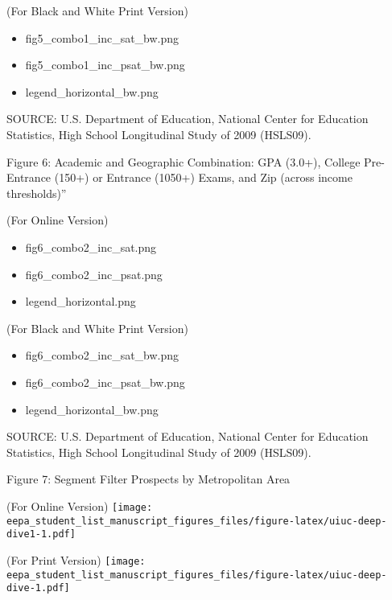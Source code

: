 \documentclass[
  12pt,
]{article}
\providecommand{\tightlist}{%
  \setlength{\itemsep}{0pt}\setlength{\parskip}{0pt}}
\begin{document}
(For Black and White Print Version)

\begin{itemize}
\tightlist
\item
  fig5\_combo1\_inc\_sat\_bw.png
\item
  fig5\_combo1\_inc\_psat\_bw.png
\item
  legend\_horizontal\_bw.png
\end{itemize}

SOURCE: U.S. Department of Education, National Center for Education Statistics, High School Longitudinal Study of 2009 (HSLS09).

\pagebreak

Figure 6: Academic and Geographic Combination: GPA (3.0+), College Pre-Entrance (150+) or Entrance (1050+) Exams, and Zip (across income thresholds)''

(For Online Version)

\begin{itemize}
\tightlist
\item
  fig6\_combo2\_inc\_sat.png
\item
  fig6\_combo2\_inc\_psat.png
\item
  legend\_horizontal.png
\end{itemize}

(For Black and White Print Version)

\begin{itemize}
\tightlist
\item
  fig6\_combo2\_inc\_sat\_bw.png
\item
  fig6\_combo2\_inc\_psat\_bw.png
\item
  legend\_horizontal\_bw.png
\end{itemize}

SOURCE: U.S. Department of Education, National Center for Education Statistics, High School Longitudinal Study of 2009 (HSLS09).

\pagebreak

Figure 7: Segment Filter Prospects by Metropolitan Area \newline 

(For Online Version) \newline
\texttt{[image: eepa\_student\_list\_manuscript\_figures\_files/figure-latex/uiuc-deep-dive1-1.pdf]}

\pagebreak

(For Print Version) \newline
\texttt{[image: eepa\_student\_list\_manuscript\_figures\_files/figure-latex/uiuc-deep-dive-1.pdf]}
\end{document}
